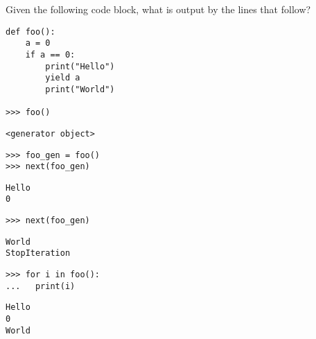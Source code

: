 \begin{blocksection}
\question Given the following code block, what is output by the lines that follow?

\begin{lstlisting}
def foo():
    a = 0
    if a == 0:
        print("Hello")
        yield a
        print("World")

>>> foo()
\end{lstlisting}
\begin{solution}[0.25in]
\begin{lstlisting}
<generator object>
\end{lstlisting}
\end{solution}

\begin{lstlisting}
>>> foo_gen = foo()
>>> next(foo_gen)
\end{lstlisting}

\begin{solution}[0.5in]
\begin{lstlisting}
Hello
0
\end{lstlisting}
\end{solution}

\begin{lstlisting}
>>> next(foo_gen)
\end{lstlisting}

\begin{solution}[0.5in]
\begin{lstlisting}
World
StopIteration
\end{lstlisting}
\end{solution}
\end{blocksection}

\begin{lstlisting}
>>> for i in foo():
...   print(i)
\end{lstlisting}

\begin{solution}[0.5in]
\begin{lstlisting}
Hello
0
World
\end{lstlisting}
\end{solution}


